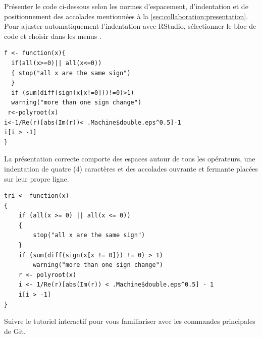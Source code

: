 \begin{exercice}
  Présenter le code ci-dessous selon les normes d'espacement,
  d'indentation et de positionnement des accolades mentionnées à la
  \autoref{sec:collaboration:presentation}. Pour ajuster
  automatiquement l'indentation avec RStudio, sélectionner le bloc de
  code et choisir dans les menus .

\begin{Schunk}
\begin{Verbatim}
f <- function(x){
  if(all(x>=0)|| all(x<=0))
  { stop("all x are the same sign")
  }
  if (sum(diff(sign(x[x!=0]))!=0)>1)
  warning("more than one sign change")
 r<-polyroot(x)
i<-1/Re(r)[abs(Im(r))< .Machine$double.eps^0.5]-1
i[i > -1]
}
\end{Verbatim}
\end{Schunk}
\begin{sol}
  La présentation correcte comporte des espaces autour de tous les
  opérateurs, une indentation de quatre (4) caractères et des
  accolades ouvrante et fermante placées sur leur propre ligne.
\begin{Schunk}
\begin{Verbatim}
tri <- function(x)
{
    if (all(x >= 0) || all(x <= 0))
    {
        stop("all x are the same sign")
    }
    if (sum(diff(sign(x[x != 0])) != 0) > 1)
        warning("more than one sign change")
    r <- polyroot(x)
    i <- 1/Re(r)[abs(Im(r)) < .Machine$double.eps^0.5] - 1
    i[i > -1]
}
\end{Verbatim}
\end{Schunk}
\end{sol}
\end{exercice}

\begin{exercice}[nosol]
  Suivre le tutoriel interactif 
  pour vous familiariser avec les commandes principales de Git.
\end{exercice}

